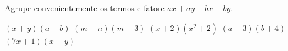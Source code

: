 Agrupe convenientemente os termos e fatore $ax+ay-bx-by$.

$(x+y)(a-b)$
$(m-n)(m-3)$
$(x+2)(x^2+2)$
$(a+3)(b+4)$
$(7x+1)(x-y)$


